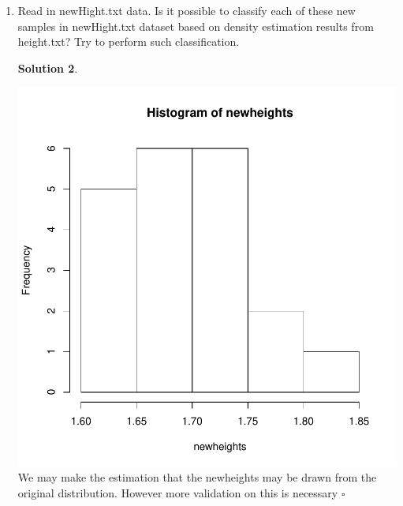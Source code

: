 \documentclass[twoside]{article}
\theoremstyle{definition}
\newtheorem*{solutionT}{Solution}
\newenvironment{solution}{\begin{cBox}\begin{solutionT}}{\hfill{\scriptsize\ensuremath{\square}}\end{solutionT}\end{cBox}}
\theoremstyle{definition}
\begin{document}
\begin{enumerate}
\begin{solution}
\end{solution}
\item Read in newHight.txt data. Is it possible to classify each of these new samples in
newHight.txt dataset based on density estimation results from height.txt? Try to
perform such classification.
\begin{solution}
\begin{Schunk}
\end{Schunk}
\includegraphics{week3-014}
We may make the estimation that the newheights may be drawn from the original distribution. However more validation on this is necessary 
\end{solution} 
\end{enumerate}
\end{document}
